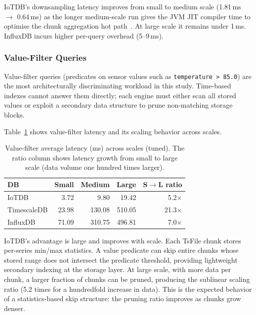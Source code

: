 IoTDB's downsampling latency improves from small to medium scale (1.81\,ms $\to$ 0.64\,ms)
as the longer medium-scale run gives the JVM JIT compiler time to optimise the chunk
aggregation hot path~\citep{barrett2017warmup}. At large scale it remains under 1\,ms. InfluxDB incurs higher per-query overhead (5--9\,ms).

\subsubsection{Value-Filter Queries}

Value-filter queries (predicates on sensor values such as \texttt{temperature > 85.0})
are the most architecturally discriminating workload in this study. Time-based indexes
cannot answer them directly; each engine must either scan all stored values or exploit
a secondary data structure to prune non-matching storage blocks.

Table~\ref{tab:vfilter} shows value-filter latency and its scaling behavior across scales.

\begin{table}[t]
  \centering
  \caption{Value-filter average latency (ms) across scales (tuned).
  The ratio column shows latency growth from small to large scale (data volume one hundred times larger).}
  \label{tab:vfilter}
  \begin{tabular}{lrrrr}
    \hline
    \textbf{DB} & \textbf{Small} & \textbf{Medium} & \textbf{Large} & \textbf{S$\to$L ratio} \\
    \hline
    IoTDB       &   3.72 &    9.80 &   19.42 &  5.2$\times$ \\
    TimescaleDB &  23.98 &  130.08 &  510.05 & 21.3$\times$ \\
    InfluxDB    &  71.09 &  310.75 &  496.81 &  7.0$\times$ \\
    \hline
  \end{tabular}
\end{table}

IoTDB's advantage is large and improves with scale. Each TsFile chunk stores
per-series min/max statistics. A value predicate can skip entire chunks whose stored range
does not intersect the predicate threshold, providing lightweight secondary indexing at
the storage layer. At large scale, with more data per chunk, a larger fraction of chunks
can be pruned, producing the sublinear scaling ratio (5.2 times for a hundredfold increase in data).
This is the expected behavior of a statistics-based skip structure: the pruning ratio
improves as chunks grow denser.

